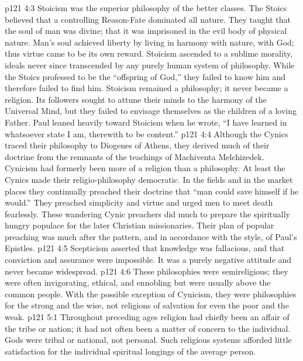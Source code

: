 \vs p121 4:3 \bibnobreakspace {} Stoicism was the superior philosophy of the better classes. The Stoics believed that a controlling Reason\hyp{}Fate dominated all nature. They taught that the soul of man was divine; that it was imprisoned in the evil body of physical nature. Man’s soul achieved liberty by living in harmony with nature, with God; thus virtue came to be its own reward. Stoicism ascended to a sublime morality, ideals never since transcended by any purely human system of philosophy. While the Stoics professed to be the “offspring of God,” they failed to know him and therefore failed to find him. Stoicism remained a philosophy; it never became a religion. Its followers sought to attune their minds to the harmony of the Universal Mind, but they failed to envisage themselves as the children of a loving Father. Paul leaned heavily toward Stoicism when he wrote, “I have learned in whatsoever state I am, therewith to be content.”
\vs p121 4:4 \bibnobreakspace {} Although the Cynics traced their philosophy to Diogenes of Athens, they derived much of their doctrine from the remnants of the teachings of Machiventa Melchizedek. Cynicism had formerly been more of a religion than a philosophy. At least the Cynics made their religio\hyp{}philosophy democratic. In the fields and in the market places they continually preached their doctrine that “man could save himself if he would.” They preached simplicity and virtue and urged men to meet death fearlessly. These wandering Cynic preachers did much to prepare the spiritually hungry populace for the later Christian missionaries. Their plan of popular preaching was much after the pattern, and in accordance with the style, of Paul’s Epistles.
\vs p121 4:5 \bibnobreakspace {} Scepticism asserted that knowledge was fallacious, and that conviction and assurance were impossible. It was a purely negative attitude and never became widespread.
\vs p121 4:6 \pc These philosophies were semireligious; they were often invigorating, ethical, and ennobling but were usually above the common people. With the possible exception of Cynicism, they were philosophies for the strong and the wise, not religions of salvation for even the poor and the weak.
\vs p121 5:1 Throughout preceding ages religion had chief\-ly been an affair of the tribe or nation; it had not often been a matter of concern to the individual. Gods were tribal or national, not personal. Such religious systems afforded little satisfaction for the individual spiritual longings of the average person.
